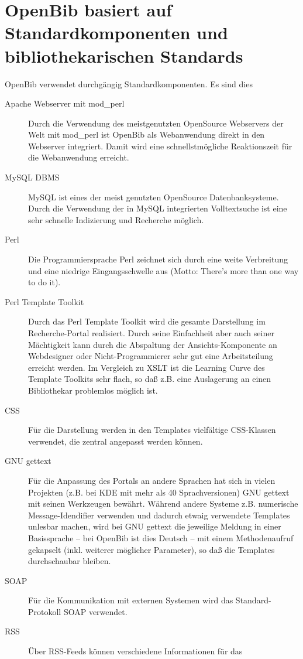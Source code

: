 \documentclass[11pt, twoside, a4paper, BCOR8mm, DIV12, bibtotoc,idxtotoc]{scrbook}
\begin{document}
\section{OpenBib basiert auf Standardkomponenten und bibliothekarischen Standards}
OpenBib verwendet durchgängig Standardkomponenten. Es sind dies
\begin{description}
\item[Apache Webserver mit mod\_perl] Durch die Verwendung des
  meistgenutzten OpenSource Web\-servers der Welt mit mod\_perl ist OpenBib als
  Webanwendung direkt in den Web\-server integriert. Damit wird eine
  schnellstmögliche Reaktionszeit für die Webanwendung erreicht.
\item[MySQL DBMS] MySQL ist eines der meist genutzten OpenSource
  Datenbanksysteme. Durch die Verwendung der in MySQL integrierten
  Volltextsuche ist eine sehr schnelle Indizierung und Recherche möglich.
\item[Perl] Die Programmiersprache Perl zeichnet sich durch eine weite
  Verbreitung und eine niedrige Eingangsschwelle aus (Motto: There's
  more than one way to do it).
\item[Perl Template Toolkit] Durch das Perl Template Toolkit wird die
  gesamte Darstellung im Re\-cher\-che-Portal realisiert. Durch seine
  Einfachheit aber auch seiner Mächtigkeit kann durch die Abspaltung
  der Ansichts-Komponente an Webdesigner oder Nicht-Programmierer sehr
  gut eine Arbeitsteilung erreicht werden. Im Vergleich zu XSLT ist
  die Learning Curve des Template Toolkits sehr flach, so daß
  z.B. eine Auslagerung an einen Bibliothekar problemlos möglich ist.
\item[CSS] Für die Darstellung werden in den Templates vielfältige
  CSS-Klassen verwendet, die zentral angepasst werden können.
\item[GNU gettext] Für die Anpassung des Portals an andere Sprachen
  hat sich in vielen Projekten (z.B. bei KDE mit mehr als 40
  Sprachversionen) GNU gettext mit seinen Werkzeugen
  bewährt. Während andere Systeme z.B. numerische Message-Idendifier
  verwenden und dadurch etwaig verwendete Templates unlesbar machen,
  wird bei GNU gettext die jeweilige Meldung in einer Basissprache
  -- bei OpenBib ist dies Deutsch -- mit einem Methodenaufruf
  gekapselt (inkl. weiterer möglicher Parameter), so daß die
  Templates durchschaubar bleiben.
\item[SOAP] Für die Kommunikation mit externen Systemen wird das
  Standard-Protokoll SOAP ver\-wen\-det.
\item[RSS] Über RSS-Feeds können verschiedene Informationen für das

\end{description}
\end{document}
